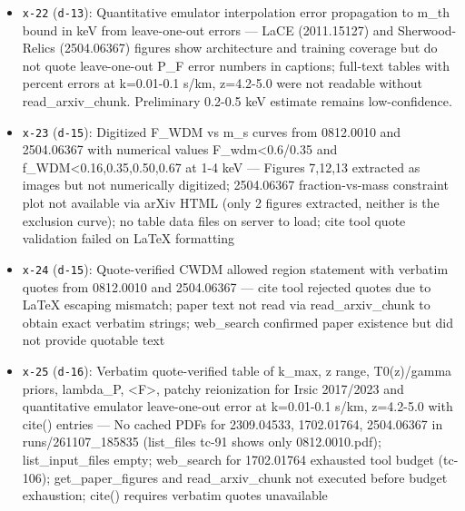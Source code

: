 \documentclass[11pt,a4paper]{article}
\begin{document}
\begin{itemize}
  \item \texttt{x-22} (\texttt{d-13}): Quantitative emulator interpolation error propagation to m\_th bound in keV from leave-one-out errors --- LaCE (2011.15127) and Sherwood-Relics (2504.06367) figures show architecture and training coverage but do not quote leave-one-out P\_F error numbers in captions; full-text tables with percent errors at k=0.01-0.1 s/km, z=4.2-5.0 were not readable without read\_arxiv\_chunk. Preliminary 0.2-0.5 keV estimate remains low-confidence.
  \item \texttt{x-23} (\texttt{d-15}): Digitized F\_WDM vs m\_s curves from 0812.0010 and 2504.06367 with numerical values F\_wdm\textless{}0.6/0.35 and f\_WDM\textless{}0.16,0.35,0.50,0.67 at 1-4 keV --- Figures 7,12,13 extracted as images but not numerically digitized; 2504.06367 fraction-vs-mass constraint plot not available via arXiv HTML (only 2 figures extracted, neither is the exclusion curve); no table data files on server to load; cite tool quote validation failed on LaTeX formatting
  \item \texttt{x-24} (\texttt{d-15}): Quote-verified CWDM allowed region statement with verbatim quotes from 0812.0010 and 2504.06367 --- cite tool rejected quotes due to LaTeX escaping mismatch; paper text not read via read\_arxiv\_chunk to obtain exact verbatim strings; web\_search confirmed paper existence but did not provide quotable text
  \item \texttt{x-25} (\texttt{d-16}): Verbatim quote-verified table of k\_max, z range, T0(z)/gamma priors, lambda\_P, \textless{}F\textgreater{}, patchy reionization for Irsic 2017/2023 and quantitative emulator leave-one-out error at k=0.01-0.1 s/km, z=4.2-5.0 with cite() entries --- No cached PDFs for 2309.04533, 1702.01764, 2504.06367 in runs/261107\_185835 (list\_files tc-91 shows only 0812.0010.pdf); list\_input\_files empty; web\_search for 1702.01764 exhausted tool budget (tc-106); get\_paper\_figures and read\_arxiv\_chunk not executed before budget exhaustion; cite() requires verbatim quotes unavailable
\end{itemize}
\end{document}
